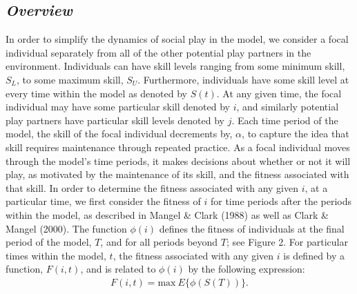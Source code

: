 \documentclass[12pt, letterpaper, fleqn]{article}
\begin{document}
  \subsection*{\it Overview }
    \indent In order to simplify the dynamics of social play in the model, we consider a focal individual separately from all of the other potential play partners in the environment. %
    Individuals can have skill levels ranging from some minimum skill, $S_L$, to some maximum skill, $S_U$. 
    Furthermore, individuals have some skill level at every time within the model as denoted by $S(t)$.
    At any given time, the focal individual may have some particular skill denoted by $i$, and similarly potential play partners have particular skill levels denoted by $j$. %
    Each time period of the model, the skill of the focal individual decrements by, $\alpha$, to capture the idea that skill requires maintenance through repeated practice. %
    As a focal individual moves through the model's time periods, it makes decisions about whether or not it will play, as motivated by the maintenance of its skill, and the fitness associated with that skill. 
    In order to determine the fitness associated with any given $i$, at a particular time, we first consider the fitness of $i$ for time periods after the periods within the model, as described in Mangel \& Clark (1988) as well as Clark \& Mangel (2000).
    The function $\phi(i)$ defines the fitness of individuals at the final period of the model, $T$, and for all periods beyond $T$; see Figure 2.
    For particular times within the model, $t$, the fitness associated with any given $i$ is defined by a function, $F(i,t)$, and is related to $\phi(i)$ by the following expression:
    \begin{eqnarray}
    F(i,t)=\text{max}~E\{\phi(S(T))\}.
    \label{first}
    \end{eqnarray}
    
\end{document}
